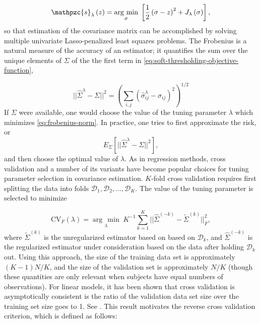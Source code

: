 \documentclass[12pt]{article}
\newcommand{\argmin}[1]{\underset{#1}{\operatorname{arg}\,\operatorname{min}}\;}
\theoremstyle{definition}
\begin{document}
\begin{equation} \label{eq:soft-thresholding-objective-function}
\mathpzc{s}_\lambda\left( z \right)  = \argmin{\sigma} \left[ \frac{1}{2} \left(\sigma - z\right)^2 + J_\lambda\left(\sigma \right)\right],
\end{equation}
so that estimation of the covariance matrix can be accomplished by solving multiple univariate Lasso-penalized least squares problems. The Frobenius is a natural measure of the accuracy of an estimator; it quantifies the sum over the unique elements of $\Sigma$ of the the first term in \ref{eq:soft-thresholding-objective-function}, 

\begin{equation} \label{eq:forbenius-norm}
\vert \vert  \hat{\Sigma}^\lambda - \Sigma \vert \vert^2 = \left(\sum_{i,j} \left(\hat{\sigma}^\lambda_{ij} - \sigma_{ij} \right)^2\right)^{1/2}
\end{equation}
\noindent
If $\Sigma$ were available, one would choose the value of the tuning parameter $\lambda$ which minimizes \ref{eq:frobenius-norm}. In practice, one tries to first approximate the risk, or 
\[
E_\Sigma\left[\vert \vert  \hat{\Sigma}^\lambda - \Sigma \vert \vert^2 \right],
\]
\noindent
and then choose the optimal value of $\lambda$.  As in regression methods, cross validation and a number of its variants have become popular choices for tuning parameter selection in covariance estimation. $K$-fold cross validation requires first splitting the data into folds $\mathcal{D}_1, \mathcal{D}_2, \dots, \mathcal{D}_K$. The value of the tuning parameter is selected to minimize

\begin{equation} \label{eq:K-fold-matrix--cv}
\mbox{CV}_F\left(\lambda \right) = \argmin{\lambda} K^{-1} \sum_{k = 1}^K  \vert \vert\hat{\Sigma}^{\left(-k\right)} - \tilde{\Sigma}^{\left(k\right)}  \vert \vert_F^2, 
\end{equation}
\noindent
where $\tilde{\Sigma}^{\left(k\right)}$ is the unregularized estimator based on based on $\mathcal{D}_k$, and $\hat{\Sigma}^{\left(-k\right)}$ is the regularized estimator under consideration based on the data after holding $\mathcal{D}_k$ out.  Using this approach, the size of the training data set is approximately $\left(K - 1 \right)N/K$, and the size of the validation set is approximately $N/K$ (though these quantities are only relevant when subjects have equal numbers of observations). For linear models, it has been shown that cross validation is asymptotically consistent is the ratio of the validation data set size over the training set size goes to 1. See \citet{shao1993linear}. This result motivates the reverse cross validation criterion, which is defined as follows:
\end{document}
